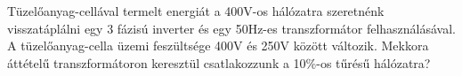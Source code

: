 \begin{example}

Tüzelőanyag-cellával termelt energiát a 400V-os hálózatra szeretnénk visszatáplálni egy 3 fázisú inverter és egy 50Hz-es transzformátor felhasználásával. A tüzelőanyag-cella üzemi feszültsége 400V és 250V között változik. Mekkora áttételű transzformátoron keresztül csatlakozzunk a 10\%-os tűrésű hálózatra?

\tcbline
\vspace{1mm}

\solution

\end{example}